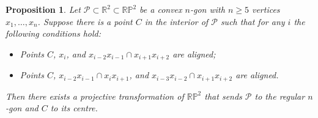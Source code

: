 \documentclass[a4paper,11pt,reqno]{amsart}
\newtheorem{prop}[thm]{Proposition}
\theoremstyle{definition}
\theoremstyle{remark}
\theoremstyle{definition}
\theoremstyle{definition}
\theoremstyle{definition}
\numberwithin{equation}{section}
\begin{document}
\begin{prop}\label{prop:chareg}
Let $\mathcal{P} \subset \mathbb{R}^{2} \subset \mathbb{RP}^{2}$ be a convex $n$-gon with $n\geq 5$ vertices $x_{1},\ldots,x_{n}$. Suppose there is a point $C$ in the interior of $\mathcal{P}$ such that for any $i$ the following conditions hold:
\begin{itemize}
    \item Points $C$, $x_i$, and $x_{i-2}x_{i-1}\cap x_{i+1}x_{i+2}$ are aligned;
    \item Points $C$, $x_{i-2}x_{i-1}\cap x_{i}x_{i+1}$, and  $x_{i-3}x_{i-2}\cap x_{i+1}x_{i+2}$ are aligned.
\end{itemize}
Then there exists a projective transformation of $\mathbb{RP}^{2}$ that sends $\mathcal{P}$ to the regular $n$-gon and $C$ to its centre.
\end{prop}
\end{document}
